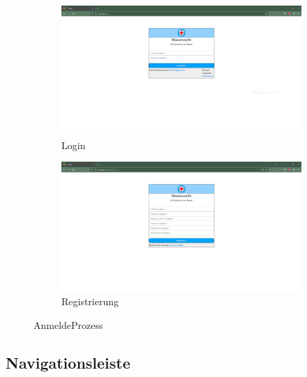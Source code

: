 \documentclass[fontsize=12pt,openright,oneside,paper=a4,BCOR=1cm]{scrbook}
\begin{document}
\begin{figure}[H]
  \centering
  \begin{subfigure}[b]{0.4\linewidth}
    \includegraphics[width=\linewidth]{Anlagen/Anwendung/1Login.png}
    \caption{Login}
  \end{subfigure}
  \begin{subfigure}[b]{0.4\linewidth}
    \includegraphics[width=\linewidth]{Anlagen/Anwendung/2Registrieren.png}
    \caption{Registrierung}
  \end{subfigure}
  \caption{AnmeldeProzess}
  \label{fig:anwendung-anmeldeprozess}
\end{figure}

\subsection{Navigationsleiste}

\end{document}
